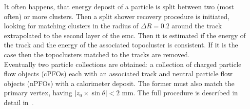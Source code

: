   	  It often happens, that energy deposit of a particle is split between two (most often) or more clusters. Then a split shower recovery procedure is initiated, looking for matching clusters in the radius of $\Delta R = 0.2$ around the track extrapolated to the second layer of the \gls{emc}. Then it is estimated if the energy of the track and the energy of the associated topocluster is consistent. If it is the case then the topoclusters matched to the tracks are removed. \\
  	  Eventually two particle collections are obtained: a collection of charged particle flow objects (cPFOs) each with an associated track and neutral particle flow objects (nPFOs) with a calorimeter deposit. The former must also match the primary vertex, having $|z_0\times \sin{\theta}| < 2$ mm. The full procedure is described in detail in~\cite{pflow}.